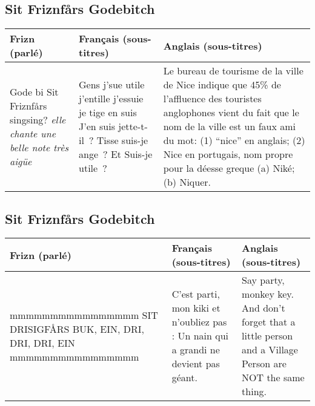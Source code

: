 \subsection*{Sit Friznfårs Godebitch}
\begin{tabular}{|p{2in}|p{2in}|p{2in}|}\hline
Frizn (parlé) & Français (sous-titres) & Anglais (sous-titres) \\\hline
Gode bi Sit Friznfårs singsing? \emph{elle chante une belle note très
aigüe} &
Gens j'sue utile j'entille j'essuie je tige en suis J'en suis
jette-t-il~? Tisse suis-je ange~? Et Suis-je utile~?&
Le bureau de tourisme de la ville de Nice indique que 45\% de l'affluence
des touristes anglophones vient du fait que le nom de la ville est un faux ami du
mot:
(1) ``nice'' en anglais; (2) Nice en portugais, nom propre pour la déesse greque
(a) Niké; (b) Niquer.  \\\hline
\end{tabular}\par
\subsection*{Sit Friznfårs Godebitch}
\begin{tabular}{|p{2in}|p{2in}|p{2in}|}\hline
Frizn (parlé) & Français (sous-titres) & Anglais (sous-titres) \\\hline
mmmmmmmmmmmmmmmm SIT DRISIGFÅRS BUK, EIN, DRI, DRI, DRI, EIN  mmmmmmmmmmmmmmmm &
C'est parti, mon kiki et n'oubliez pas : Un nain qui a grandi ne devient pas
géant.&
Say party, monkey key. And don't forget that a little person and a Village
Person are NOT the same thing.  \\\hline
\end{tabular}\par\hfill\\

